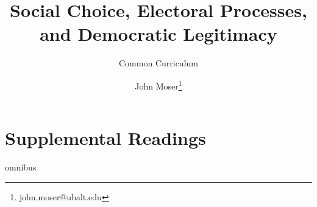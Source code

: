 \documentclass[twoside,titlepage,12pt,appendixprefix=true]{scrbook}
\begin{document}
    \author{John Moser\thanks{john.moser@ubalt.edu}}

    \title{Social Choice, Electoral Processes, and Democratic Legitimacy}
    \subtitle{Common Curriculum}
    \maketitle[0]
    \frontmatter
    \tableofcontents
    
    \mainmatter
    
    \backmatter
    \part{Supplemental Readings}
    \appendix
    {omnibus}
    \printbibliography[title=Bibliography,heading=bibintoc]
\end{document}
